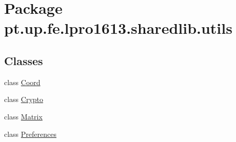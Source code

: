 \hypertarget{namespacept_1_1up_1_1fe_1_1lpro1613_1_1sharedlib_1_1utils}{}\section{Package pt.\+up.\+fe.\+lpro1613.\+sharedlib.\+utils}
\label{namespacept_1_1up_1_1fe_1_1lpro1613_1_1sharedlib_1_1utils}
\subsection*{Classes}
\begin{DoxyCompactItemize}
\item 
class \hyperlink{classpt_1_1up_1_1fe_1_1lpro1613_1_1sharedlib_1_1utils_1_1_coord}{Coord}
\item 
class \hyperlink{classpt_1_1up_1_1fe_1_1lpro1613_1_1sharedlib_1_1utils_1_1_crypto}{Crypto}
\item 
class \hyperlink{classpt_1_1up_1_1fe_1_1lpro1613_1_1sharedlib_1_1utils_1_1_matrix}{Matrix}
\item 
class \hyperlink{classpt_1_1up_1_1fe_1_1lpro1613_1_1sharedlib_1_1utils_1_1_preferences}{Preferences}
\end{DoxyCompactItemize}

